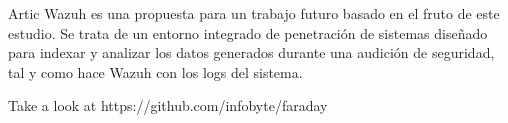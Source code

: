 Artic Wazuh es una propuesta para un trabajo futuro basado en el fruto de este estudio. Se trata de un entorno integrado de penetración de sistemas diseñado para indexar y analizar los datos generados durante una audición de seguridad, tal y como hace Wazuh con los logs del sistema. 

Take a look at https://github.com/infobyte/faraday

